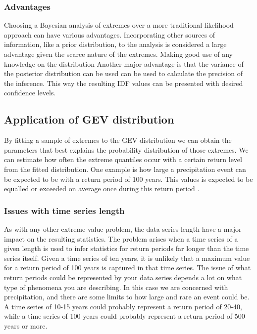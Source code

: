 \documentclass[12pt]{article}
\begin{document}
{\subsubsection{Advantages}
Choosing a Bayesian analysis of extremes over a more traditional likelihood approach can have various advantages. Incorporating other sources of information, like a prior distribution, to the analysis is considered a large advantage given the scarce nature of the extremes. Making good use of any knowledge on the distribution Another major advantage is that the variance of the posterior distribution can be used can be used to calculate the precision of the inference. This way the resulting IDF values can be presented with desired confidence levels.   




\subsection{Application of GEV distribution}
By fitting a sample of extremes to the GEV distribution we can obtain the parameters that best explains the probability distribution of those extremes. We can estimate how often the extreme quantiles occur with a certain return level from the fitted distribution. One example is how large a precipitation event can be expected to be with a return period of 100 years. This values is expected to be equalled or exceeded on average once during this return period \cite{gmao}.  

  

\subsubsection{Issues with time series length}

As with any other extreme value problem, the data series length have a major impact on the resulting statistics. The problem arises when a time series of a given length is used to infer statistics for return periods far longer than the time series itself. Given a time series of ten years, it is unlikely that a maximum value for a return period of 100 years is captured in that time series. The issue of what return periods could be represented by your data series depends a lot on what type of phenomena you are describing. In this case we are concerned with precipitation, and there are some limits to how large and rare an event could be. A time series of 10-15 years could probably represent a return period of 20-40, while a time series of 100 years could probably represent a return period of 500 years or more. 

}
\end{document}
